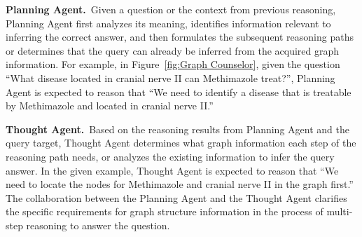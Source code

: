 \documentclass[11pt]{article}
\begin{document}
\noindent\textbf{Planning Agent.} \,Given a question or the context from previous reasoning, Planning Agent first analyzes its meaning, identifies information relevant to inferring the correct answer, and then formulates the subsequent reasoning paths or determines that the query can already be inferred from the acquired graph information. For example, in Figure~\ref{fig:Graph Counselor}, given the question “What disease located in cranial nerve II can Methimazole treat?”, Planning Agent is expected to reason that “We need to identify a disease that is treatable by Methimazole and located in cranial nerve II.”

\noindent\textbf{Thought Agent.} \,Based on the reasoning results from Planning Agent and the query target, Thought Agent determines what graph information each step of the reasoning path needs, or analyzes the existing information to infer the query answer. In the given example, Thought Agent is expected to reason that “We need to locate the nodes for Methimazole and cranial nerve II in the graph first.” The collaboration between the Planning Agent and the Thought Agent clarifies the specific requirements for graph structure information in the process of multi-step reasoning to answer the question.
\end{document}
